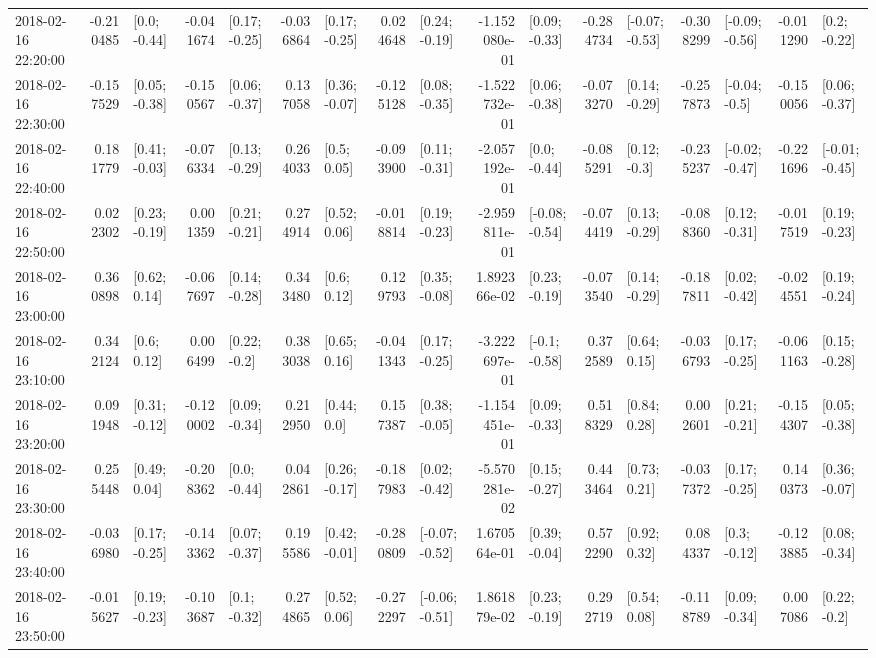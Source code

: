 \begin{tabular}{lrlrlrlrlrlrlrlrl}
2018-02-16 22:20:00 & -0.210485 &    [0.0; -0.44] & -0.041674 &   [0.17; -0.25] & -0.036864 &   [0.17; -0.25] &  0.024648 &   [0.24; -0.19] & -1.152080e-01 &   [0.09; -0.33] & -0.284734 &  [-0.07; -0.53] & -0.308299 &  [-0.09; -0.56] & -0.011290 &    [0.2; -0.22] \\
2018-02-16 22:30:00 & -0.157529 &   [0.05; -0.38] & -0.150567 &   [0.06; -0.37] &  0.137058 &   [0.36; -0.07] & -0.125128 &   [0.08; -0.35] & -1.522732e-01 &   [0.06; -0.38] & -0.073270 &   [0.14; -0.29] & -0.257873 &   [-0.04; -0.5] & -0.150056 &   [0.06; -0.37] \\
2018-02-16 22:40:00 &  0.181779 &   [0.41; -0.03] & -0.076334 &   [0.13; -0.29] &  0.264033 &     [0.5; 0.05] & -0.093900 &   [0.11; -0.31] & -2.057192e-01 &    [0.0; -0.44] & -0.085291 &    [0.12; -0.3] & -0.235237 &  [-0.02; -0.47] & -0.221696 &  [-0.01; -0.45] \\
2018-02-16 22:50:00 &  0.022302 &   [0.23; -0.19] &  0.001359 &   [0.21; -0.21] &  0.274914 &    [0.52; 0.06] & -0.018814 &   [0.19; -0.23] & -2.959811e-01 &  [-0.08; -0.54] & -0.074419 &   [0.13; -0.29] & -0.088360 &   [0.12; -0.31] & -0.017519 &   [0.19; -0.23] \\
2018-02-16 23:00:00 &  0.360898 &    [0.62; 0.14] & -0.067697 &   [0.14; -0.28] &  0.343480 &     [0.6; 0.12] &  0.129793 &   [0.35; -0.08] &  1.892366e-02 &   [0.23; -0.19] & -0.073540 &   [0.14; -0.29] & -0.187811 &   [0.02; -0.42] & -0.024551 &   [0.19; -0.24] \\
2018-02-16 23:10:00 &  0.342124 &     [0.6; 0.12] &  0.006499 &    [0.22; -0.2] &  0.383038 &    [0.65; 0.16] & -0.041343 &   [0.17; -0.25] & -3.222697e-01 &   [-0.1; -0.58] &  0.372589 &    [0.64; 0.15] & -0.036793 &   [0.17; -0.25] & -0.061163 &   [0.15; -0.28] \\
2018-02-16 23:20:00 &  0.091948 &   [0.31; -0.12] & -0.120002 &   [0.09; -0.34] &  0.212950 &     [0.44; 0.0] &  0.157387 &   [0.38; -0.05] & -1.154451e-01 &   [0.09; -0.33] &  0.518329 &    [0.84; 0.28] &  0.002601 &   [0.21; -0.21] & -0.154307 &   [0.05; -0.38] \\
2018-02-16 23:30:00 &  0.255448 &    [0.49; 0.04] & -0.208362 &    [0.0; -0.44] &  0.042861 &   [0.26; -0.17] & -0.187983 &   [0.02; -0.42] & -5.570281e-02 &   [0.15; -0.27] &  0.443464 &    [0.73; 0.21] & -0.037372 &   [0.17; -0.25] &  0.140373 &   [0.36; -0.07] \\
2018-02-16 23:40:00 & -0.036980 &   [0.17; -0.25] & -0.143362 &   [0.07; -0.37] &  0.195586 &   [0.42; -0.01] & -0.280809 &  [-0.07; -0.52] &  1.670564e-01 &   [0.39; -0.04] &  0.572290 &    [0.92; 0.32] &  0.084337 &    [0.3; -0.12] & -0.123885 &   [0.08; -0.34] \\
2018-02-16 23:50:00 & -0.015627 &   [0.19; -0.23] & -0.103687 &    [0.1; -0.32] &  0.274865 &    [0.52; 0.06] & -0.272297 &  [-0.06; -0.51] &  1.861879e-02 &   [0.23; -0.19] &  0.292719 &    [0.54; 0.08] & -0.118789 &   [0.09; -0.34] &  0.007086 &    [0.22; -0.2] \\
\bottomrule
\end{tabular}

